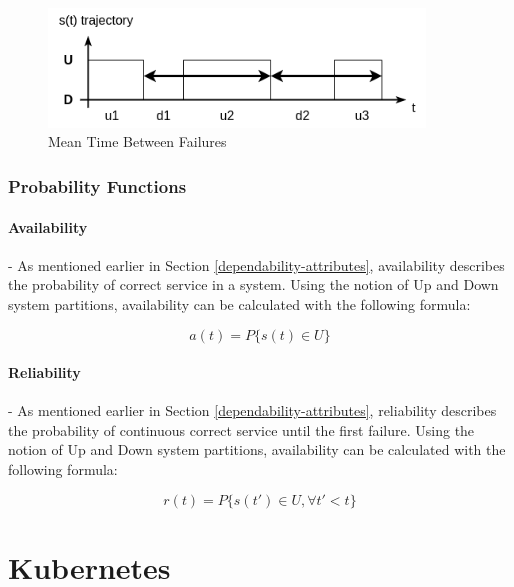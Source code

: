 \begin{figure}[h]
	\centering
	\includegraphics[width=100mm, keepaspectratio]{figures/MTBF.png}
	\caption{ Mean Time Between Failures \cite{DependabilityBMEMIT} }
	\label{fig:mtbf}
\end{figure}

\subsubsection{Probability Functions} \label{background-dep-metrics-prob-funcs}

\paragraph{Availability} - As mentioned earlier in Section \ref{dependability-attributes}, availability describes the probability of correct service in a system. Using the notion of Up and Down system partitions, availability can be calculated with the following formula:

\[
a(t) = P\{ s(t) \in U \}
\]

\paragraph{Reliability} - As mentioned earlier in Section \ref{dependability-attributes}, reliability describes the probability of continuous correct service until the first failure. Using the notion of Up and Down system partitions, availability can be calculated with the following formula:

\[
r(t) = P\{ s(t') \in U, \forall t' < t \}
\]


\section{Kubernetes}

